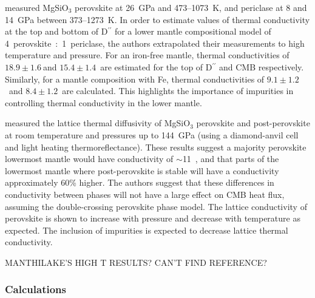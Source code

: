 \citet{Manthilake2011} measured MgSiO$_3$ perovskite at 26~GPa and 473--1073~K, and periclase at 8 and 14~GPa between 373--1273~K. In order to estimate values of thermal conductivity at the top and bottom of D$^{\prime \prime}$ for a lower mantle compositional model of 4~perovskite~:~1~periclase, the authors extrapolated their measurements to high temperature and pressure. For an iron-free mantle, thermal conductivities of $18.9\pm1.6~$\wmks and $15.4\pm1.4$~\wmks are estimated for the top of D$^{\prime \prime}$ and CMB respectively. Similarly, for a mantle composition with Fe, thermal conductivities of $9.1\pm1.2$~\wmks and $8.4\pm1.2$~\wmks are calculated. This highlights the importance of impurities in controlling thermal conductivity in the lower mantle.

\citet{Ohta2012} measured the lattice thermal diffusivity of MgSiO$_3$ perovskite and post-perovskite at room temperature and pressures up to 144~GPa (using a diamond-anvil cell and light heating thermoreflectance). These results suggest a majority perovskite lowermost mantle would have conductivity of $\sim$11~\wmk, and that parts of the lowermost mantle where post-perovskite is stable will have a conductivity approximately 60\% higher. The authors suggest that these differences in conductivity between phases will not have a large effect on CMB heat flux, assuming the double-crossing perovskite phase model. The lattice conductivity of \mgsios perovskite is shown to increase with pressure and decrease with temperature as expected. The inclusion of impurities is expected to decrease lattice thermal conductivity.

MANTHILAKE'S HIGH T RESULTS? CAN'T FIND REFERENCE?

\subsubsection{Calculations}


